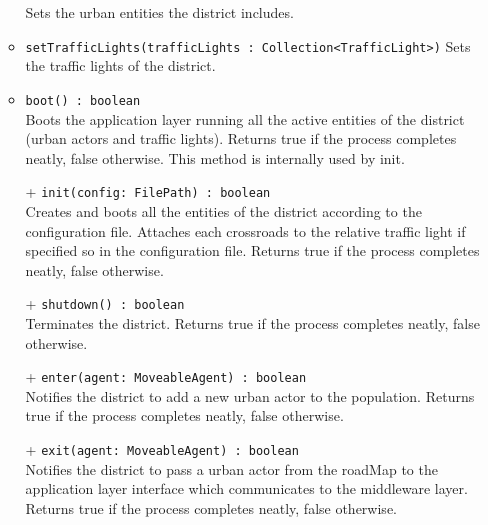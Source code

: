 \begin{itemize}
\begin{itemize}
    Sets the urban entities the district includes.
    \item \texttt{setTrafficLights(trafficLights : Collection<TrafficLight>)}
    Sets the traffic lights of the district.
    \item \texttt{boot() : boolean} \\
    Boots the application layer running all the active entities of the 
    district (urban actors and traffic lights).
    Returns true if the process completes neatly, false otherwise. 
    This method is internally used by init.
    \item[+] \texttt{init(config: FilePath) : boolean} \\
    Creates and boots all the entities of the district according to the 
    configuration file. Attaches each crossroads to the relative traffic light
    if specified so in the configuration file. 
    Returns true if the process completes neatly, false otherwise.
    \item[+] \texttt{shutdown() : boolean} \\
    Terminates the district. Returns true if the process completes neatly,
    false otherwise.
    \item[+] \texttt{enter(agent: MoveableAgent) : boolean} \\
    Notifies the district to add a new urban actor to the population.
    Returns true if the process completes neatly, false otherwise.
    \item[+] \texttt{exit(agent: MoveableAgent) : boolean} \\
    Notifies the district to pass a urban actor from the roadMap to the 
    application layer interface which communicates to the middleware layer.
    Returns true if the process completes neatly, false otherwise.
  \end{itemize}
\end{itemize} 
